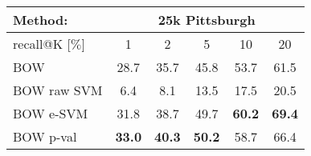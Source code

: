 
\begin{tabularx}{0.97\linewidth}{|l|c c c c c|}
  \hline 
  \rowcolor{maroon!50}
  Method: & \multicolumn{5}{c|}{25k Pittsburgh}\\
  \hline 
  \hline 
  \rowcolor{maroon!50}
  recall@K [$\%$]         & 1 & 2 & 5 & 10 & 20 \\
  \hline
  \rowcolor{maroon!10}
  BOW                     & 28.7 & 35.7 & 45.8 & 53.7 & 61.5 \\
  \rowcolor{maroon!10}
  BOW raw SVM             & 6.4  &  8.1 & 13.5 & 17.5 & 20.5 \\ 
  \rowcolor{maroon!10}
  BOW e-SVM               & 31.8          &     38.7      & 49.7          & \textbf{60.2} & \textbf{69.4} \\
  \rowcolor{maroon!10}
  BOW p-val               & \textbf{33.0} & \textbf{40.3} & \textbf{50.2} & 58.7 & 66.4 \\
  \hline
\end{tabularx}